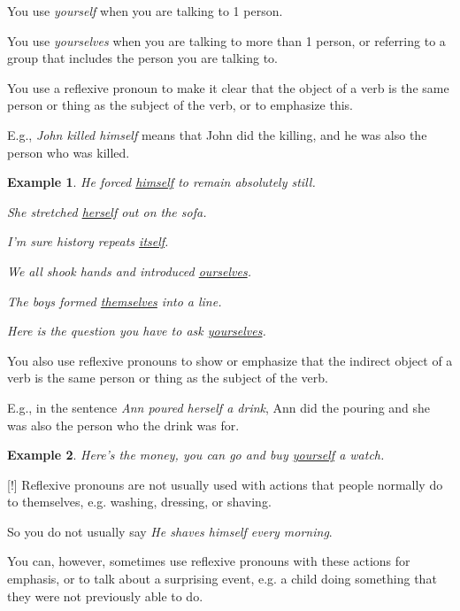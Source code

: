 \documentclass[oneside]{book}
\numberwithin{equation}{section}
\newtheorem{example}{Example}[section]
\begin{document}
You use \textit{yourself} when you are talking to 1 person.

You use \textit{yourselves} when you are talking to more than 1 person, or referring to a group that includes the person you are talking to.

%
\noindent{} You use a reflexive pronoun to make it clear that the object of a verb is the same person or thing as the subject of the verb, or to emphasize this.

%
E.g., \textit{John killed himself} means that John did the killing, and he was also the person who was killed.
\begin{example}
    He forced \underline{himself} to remain absolutely still.
    
    She stretched \underline{herself} out on the sofa.
    
    I'm sure history repeats \underline{itself}.
    
    We all shook hands and introduced \underline{ourselves}.
    
    The boys formed \underline{themselves} into a line.
    
    Here is the question you have to ask \underline{yourselves}.
\end{example}
You also use reflexive pronouns to show or emphasize that the indirect object of a verb is the same person or thing as the subject of the verb.

E.g., in the sentence \textit{Ann poured herself a drink}, Ann did the pouring and she was also the person who the drink was for.
\begin{example}
    Here's the money, you can go and buy \underline{yourself} a watch.
\end{example}
%
\noindent{} [!] Reflexive pronouns are not usually used with actions that people normally do to themselves, e.g. washing, dressing, or shaving.

So you do not usually say \textit{He shaves himself every morning}.

%
You can, however, sometimes use reflexive pronouns with these actions for emphasis, or to talk about a surprising event, e.g. a child doing something that they were not previously able to do.
\end{document}
